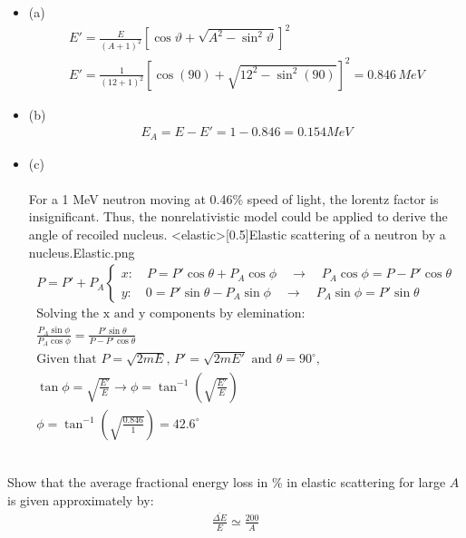 \documentclass{homework}
\begin{document}
\begin{sol}
  \begin{itemize}
    \item{(a)}
    \begin{gather*}
      E' = \frac{E}{(A+1)^2} 
      \left[ \cos \vartheta + \sqrt{A^{2} - \sin^{2} \vartheta} \right]^2\\
      E' = \frac{1}{(12+1)^2}[ \cos(90) + \sqrt{12^{2} - \sin^{2}(90)}]^{2} = 0.846\,MeV
    \end{gather*}
    \item{(b)}
    \begin{gather*}
      E_{A} = E - E' = 1 - 0.846 = 0.154 MeV
    \end{gather*}
    \item{(c)}\\\\
    For a 1 MeV neutron moving at 0.46\% speed of light, the lorentz factor is insignificant. Thus, the 
    nonrelativistic model could be applied to derive the angle of recoiled nucleus.
    \img<elastic>[0.5]{Elastic scattering of a neutron by a nucleus.}{Elastic.png}
    \begin{gather*}
      P = P' + P_{A}
      \begin{cases}
        x: \quad P = P'\cos \theta + P_{A} \cos \phi \quad \rightarrow \quad P_{A} \cos \phi = P - P' \cos \theta \\
        y: \quad 0 = P'\sin \theta - P_{A}\sin \phi \quad \rightarrow \quad P_{A} \sin \phi = P' \sin \theta
      \end{cases} \\
      \text{Solving the x and y components by elemination:}\\
      \frac{P_A \sin \phi}{P_A \cos \phi} = \frac{P'\sin \theta}{P - P'\cos \theta}\\
      \text{Given that }P =\sqrt{2mE} \text{, } P' = \sqrt{2mE'} \text{ and }\theta = 90^\circ \text{,} \\
      \tan \phi = \sqrt{\frac{E'}{E}} \rightarrow \phi = \tan^{-1} (\sqrt{\frac{E'}{E}})\\
      \boxed{\phi = \tan^{-1}(\sqrt{\frac{0.846}{1}}) = 42.6^\circ}
    \end{gather*}
  \end{itemize}
\end{sol}

\question\\
Show that the average fractional energy loss in \% in elastic scattering 
for large $A$ is given approximately by:
\begin{gather*}
\frac{\overline{\Delta E}}{E} \simeq \frac{200}{A}
\end{gather*}
\end{document}
